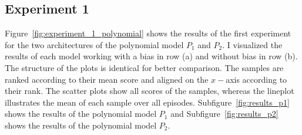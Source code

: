 \subsection{Experiment 1}
Figure~\ref{fig:experiment_1_polynomial} shows the results of the first experiment for the two architectures of the polynomial model $P_1$ and $P_2$. I visualized the results of each model working with a bias in row (a) and without bias in row (b). The structure of the plots is identical for better comparison. The samples are ranked according to their mean score and aligned on the $x-$axis according to their rank. The scatter plots show all scores of the samples, whereas the lineplot illustrates the mean of each sample over all episodes.
Subfigure~\ref{fig:results_p1} shows the results of the polynomial model $P_1$ and Subfigure~\ref{fig:results_p2} shows the results of the polynomial model $P_2$.
